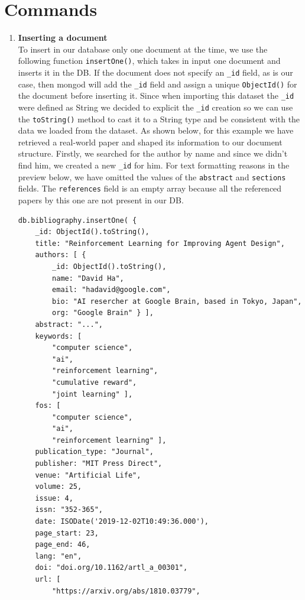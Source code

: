 \section{Commands}
\label{sec:commands2}%
\begin{enumerate}
    \item \textbf{Inserting a document}\\
    To insert in our database only one document at the time, we use the following function \verb|insertOne()|, which takes in input one document and inserts it in the DB\@.
    If the document does not specify an \verb|_id| field, as is our case, then mongod
    \footnotemark{}
    will add the \verb|_id| field and assign a unique \verb|ObjectId()| for the document before inserting it.
    Since when importing this dataset the \verb|_id| were defined as String we decided to explicit the \verb|_id| creation so we can use the \verb|toString()| method to cast it to a String type and be consistent with the data we loaded from the dataset.
    As shown below, for this example we have retrieved a real-world paper and shaped its information to our document structure.
    Firstly, we searched for the author by name and since we didn't find him, we created a new \verb|_id| for him.
    For text formatting reasons in the preview below, we have omitted the values of the \verb|abstract| and \verb|sections| fields.
    The \verb|references| field is an empty array because all the referenced papers by this one are not present in our DB\@.
    \begin{lstlisting}[label={lst:lstlisting55}]
db.bibliography.insertOne( {
    _id: ObjectId().toString(),
    title: "Reinforcement Learning for Improving Agent Design",
    authors: [ {
        _id: ObjectId().toString(),
        name: "David Ha",
        email: "hadavid@google.com",
        bio: "AI resercher at Google Brain, based in Tokyo, Japan",
        org: "Google Brain" } ],
    abstract: "...",
    keywords: [
        "computer science",
        "ai",
        "reinforcement learning",
        "cumulative reward",
        "joint learning" ],
    fos: [
        "computer science",
        "ai",
        "reinforcement learning" ],
    publication_type: "Journal",
    publisher: "MIT Press Direct",
    venue: "Artificial Life",
    volume: 25,
    issue: 4,
    issn: "352-365",
    date: ISODate('2019-12-02T10:49:36.000'),
    page_start: 23,
    page_end: 46,
    lang: "en",
    doi: "doi.org/10.1162/artl_a_00301",
    url: [
        "https://arxiv.org/abs/1810.03779",

\end{lstlisting}
\end{enumerate}
